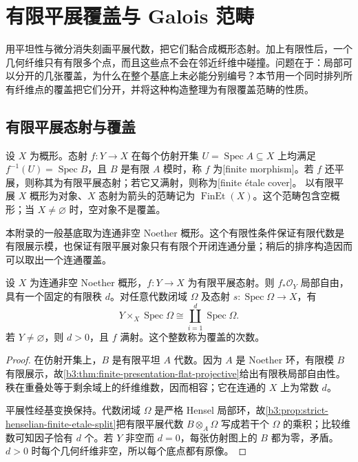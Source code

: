 
\section{有限平展覆盖与 Galois 范畴}
\label{b3:sec:I01}

用平坦性与微分消失刻画平展代数，把它们黏合成概形态射。加上有限性后，一个几何纤维只有有限多个点，而且这些点不会在邻近纤维中碰撞。问题在于：局部可以分开的几张覆盖，为什么在整个基底上未必能分别编号？本节用一个同时排列所有纤维点的覆盖把它们分开，并将这种构造整理为有限覆盖范畴的性质。

\subsection{有限平展态射与覆盖}
\label{b3:subsec:I01:01}

\begin{definition}\label{b3:def:I-finite-etale-cover}
	设 \(X\) 为概形。态射 \(f:Y\rightarrow X\) 在每个仿射开集 \(U=\operatorname{Spec}A\subseteq X\) 上均满足 \(f^{-1}(U)=\operatorname{Spec}B\)，且 \(B\) 是有限 \(A\) 模时，称 \(f\) 为[finite morphism]。若 \(f\) 还平展，则称其为有限平展态射；若它又满射，则称为[finite étale cover]。
	以有限平展 \(X\) 概形为对象、\(X\) 态射为箭头的范畴记为 \(\operatorname{FinEt}(X)\)。这个范畴包含空概形；当 \(X\ne\varnothing\) 时，空对象不是覆盖。
\end{definition}

本附录的一般基底取为连通非空 Noether 概形。这个有限性条件保证有限代数是有限展示模，也保证有限平展对象只有有限个开闭连通分量；稍后的排序构造因而可以取出一个连通覆盖。

\begin{proposition}\label{b3:prop:I-finite-etale-rank}
	设 \(X\) 为连通非空 Noether 概形，\(f:Y\rightarrow X\) 为有限平展态射。则 \(f_*\mathcal O_Y\) 局部自由，具有一个固定的有限秩 \(d\)。对任意代数闭域 \(\Omega\) 及态射 \(s:\operatorname{Spec}\Omega\rightarrow X\)，有
	\[
		Y\times_X\operatorname{Spec}\Omega
		\cong\coprod_{i=1}^{d}\operatorname{Spec}\Omega.
	\]
	若 \(Y\ne\varnothing\)，则 \(d>0\)，且 \(f\) 满射。这个整数称为覆盖的次数。
\end{proposition}
\begin{proof}
	在仿射开集上，\(B\) 是有限平坦 \(A\) 代数。因为 \(A\) 是 Noether 环，有限模 \(B\) 有限展示，故\cref{b3:thm:finite-presentation-flat-projective}给出有限秩局部自由性。秩在重叠处等于剩余域上的纤维维数，因而相容；它在连通的 \(X\) 上为常数 \(d\)。

	平展性经基变换保持。代数闭域 \(\Omega\) 是严格 Hensel 局部环，故\cref{b3:prop:strict-henselian-finite-etale-split}把有限平展代数 \(B\otimes_A\Omega\) 写成若干个 \(\Omega\) 的乘积；比较维数可知因子恰有 \(d\) 个。若 \(Y\) 非空而 \(d=0\)，每张仿射图上的 \(B\) 都为零，矛盾。\(d>0\) 时每个几何纤维非空，所以每个底点都有原像。
\end{proof}

